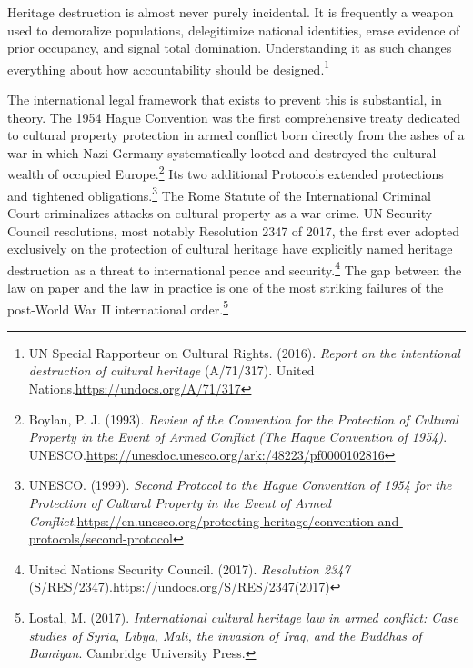 Heritage destruction is almost never purely incidental. It is frequently a weapon used to demoralize populations, delegitimize national identities, erase evidence of prior occupancy, and signal total domination. Understanding it as such changes everything about how accountability should be designed.\footnote{UN Special Rapporteur on Cultural Rights. (2016). \emph{Report on the intentional destruction of cultural heritage} (A/71/317). United Nations.\url{https://undocs.org/A/71/317}}

The international legal framework that exists to prevent this is substantial, in theory. The 1954 Hague Convention was the first comprehensive treaty dedicated to cultural property protection in armed conflict  born directly from the ashes of a war in which Nazi Germany systematically looted and destroyed the cultural wealth of occupied Europe.\footnote{Boylan, P. J. (1993). \emph{Review of the Convention for the Protection of Cultural Property in the Event of Armed Conflict (The Hague Convention of 1954)}. UNESCO.\url{https://unesdoc.unesco.org/ark:/48223/pf0000102816}} Its two additional Protocols extended protections and tightened obligations.\footnote{UNESCO. (1999). \emph{Second Protocol to the Hague Convention of 1954 for the Protection of Cultural Property in the Event of Armed Conflict}.\url{https://en.unesco.org/protecting-heritage/convention-and-protocols/second-protocol}} The Rome Statute of the International Criminal Court criminalizes attacks on cultural property as a war crime. UN Security Council resolutions, most notably Resolution 2347 of 2017, the first ever adopted exclusively on the protection of cultural heritage have explicitly named heritage destruction as a threat to international peace and security.\footnote{United Nations Security Council. (2017). \emph{Resolution 2347} (S/RES/2347).\url{https://undocs.org/S/RES/2347(2017)}} The gap between the law on paper and the law in practice is one of the most striking failures of the post-World War II international order.\footnote{Lostal, M. (2017). \emph{International cultural heritage law in armed conflict: Case studies of Syria, Libya, Mali, the invasion of Iraq, and the Buddhas of Bamiyan}. Cambridge University Press.}

